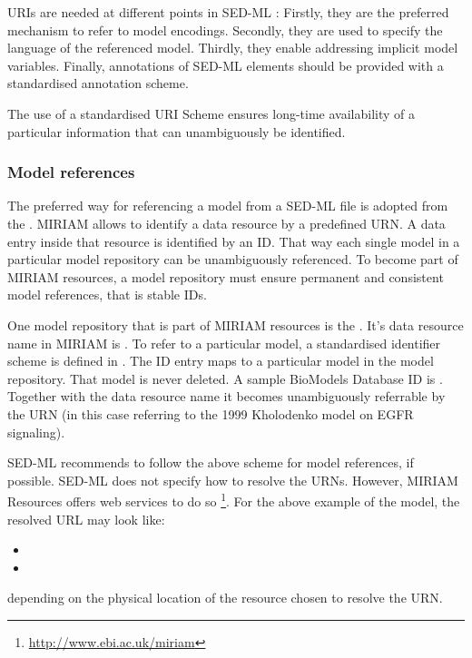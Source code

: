 \label{sec:uriScheme}

URIs are needed at different points in SED-ML \LoneVone: 
Firstly, they are the preferred mechanism to refer to model encodings. 
Secondly, they are used to specify the language of the referenced model.
Thirdly, they enable addressing implicit model variables.
Finally, annotations of SED-ML elements should be provided with a standardised annotation scheme.

The use of a standardised URI Scheme ensures long-time availability  of a particular information that can unambiguously be identified. 

\subsubsection{Model references}
\label{sec:modelURI}
The preferred way for referencing a model from a SED-ML file is adopted from the .
MIRIAM allows to identify  a data resource by a predefined URN. A data entry inside that resource is identified by an ID. 
That way each single  model  in a particular model repository can be unambiguously referenced. To become part of MIRIAM resources, a model repository must ensure permanent and consistent model references, that is stable IDs.

One model repository that is part of MIRIAM resources is the  \citep{LDR+10}. It's data resource name in MIRIAM is . To refer to a particular model, a standardised identifier scheme is defined in . The ID entry maps to a particular model in the model repository. That model is never deleted. 
A sample BioModels Database ID is . Together with the data resource name it becomes unambiguously referrable by the URN  (in this case referring to the 1999 Kholodenko model on EGFR signaling). 
%

SED-ML recommends to follow the above scheme for model references, if possible. 
SED-ML does not specify how to resolve the URNs. However, MIRIAM Resources offers web services to do so \footnote{\url{http://www.ebi.ac.uk/miriam}}. For the above example of the  model, the resolved URL may look like: 
\begin{itemize}
 \item{}
 \item{}
\end{itemize}
depending on the physical location of the resource chosen to resolve the URN.

